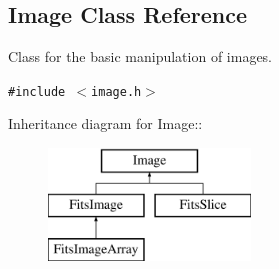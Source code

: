 \subsection{Image  Class Reference}
\label{class_image}
Class for the basic manipulation of images. 


{\tt \#include $<$image.h$>$}

Inheritance diagram for Image::\begin{figure}[H]
\begin{center}
\leavevmode
\includegraphics[height=3cm]{class_image}
\end{center}
\end{figure}

